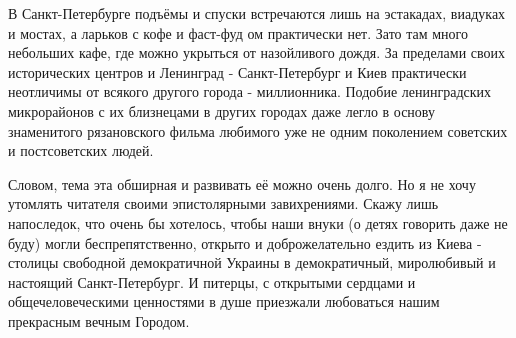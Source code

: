В Санкт-Петербурге подъёмы и спуски встречаются лишь на эстакадах, виадуках и
мостах, а ларьков с кофе и фаст-фуд ом практически нет. Зато там много
небольших кафе, где можно укрыться от назойливого дождя. За пределами своих
исторических центров и Ленинград - Санкт-Петербург и Киев практически
неотличимы от всякого другого города - миллионника. Подобие ленинградских
микрорайонов с их близнецами в других городах даже легло в основу знаменитого
рязановского фильма любимого уже не одним поколением советских и постсоветских
людей. 

Словом, тема эта обширная и развивать её можно очень долго. Но я не хочу
утомлять читателя своими эпистолярными завихрениями. Скажу лишь напоследок, что
очень бы хотелось, чтобы наши внуки (о детях говорить даже не буду) могли
беспрепятственно, открыто и доброжелательно ездить из Киева - столицы свободной
демократичной Украины в демократичный, миролюбивый и настоящий Санкт-Петербург.
И питерцы, с открытыми сердцами и общечеловеческими ценностями в душе приезжали
любоваться нашим прекрасным вечным Городом.
